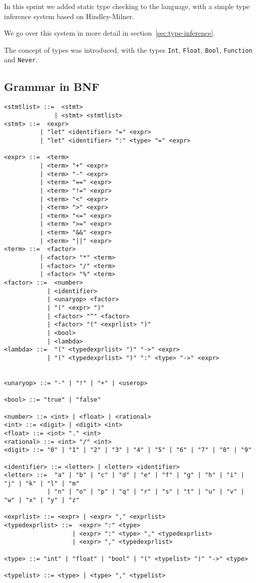 In this sprint we added static type checking to the language, with a simple type inference system based on 
Hindley-Milner.

We go over this system in more detail in section~\ref{sec:type-inference}.

The concept of types was introduced, with the types \texttt{Int}, \texttt{Float}, \texttt{Bool}, \texttt{Function} and
\texttt{Never}.

\subsection{Grammar in BNF}\label{subsec:grammar-in-bnf5}

\begin{verbatim}
<stmtlist> ::=  <stmt> 
              | <stmt> <stmtlist>
<stmt> ::=  <expr> 
          | "let" <identifier> "=" <expr>
          | "let" <identifier> ":" <type> "=" <expr>

<expr> ::=  <term> 
          | <term> "+" <expr> 
          | <term> "-" <expr>
          | <term> "==" <expr>
          | <term> "!=" <expr>
          | <term> "<" <expr>
          | <term> ">" <expr>
          | <term> "<=" <expr>
          | <term> ">=" <expr>
          | <term> "&&" <expr>
          | <term> "||" <expr>
<term> ::=  <factor> 
          | <factor> "*" <term> 
          | <factor> "/" <term> 
          | <factor> "%" <term> 
<factor> ::=  <number> 
            | <identifier> 
            | <unaryop> <factor>
            | "(" <expr> ")" 
            | <factor> "^" <factor>
            | <factor> "(" <exprlist> ")"
            | <bool>
            | <lambda>
<lambda> ::=  "(" <typedexprlist> ")" "->" <expr>
            | "(" <typedexprlist> ")" ":" <type> "->" <expr>


<unaryop> ::= "-" | "!" | "+" | <userop>

<bool> ::= "true" | "false"
            
<number> ::= <int> | <float> | <rational>
<int> ::= <digit> | <digit> <int>
<float> ::= <int> "." <int>
<rational> ::= <int> "/" <int>
<digit> ::= "0" | "1" | "2" | "3" | "4" | "5" | "6" | "7" | "8" | "9"

<identifier> ::= <letter> | <letter> <identifier>
<letter> ::=  "a" | "b" | "c" | "d" | "e" | "f" | "g" | "h" | "i" | "j" | "k" | "l" | "m" 
            | "n" | "o" | "p" | "q" | "r" | "s" | "t" | "u" | "v" | "w" | "x" | "y" | "z"
            
<exprlist> ::= <expr> | <expr> "," <exprlist>
<typedexprlist> ::=  <expr> ":" <type> 
                   | <expr> ":" <type> "," <typedexprlist>
                   | <expr> "," <typedexprlist>
    
<type> ::= "int" | "float" | "bool" | "(" <typelist> ")" "->" <type>

<typelist> ::= <type> | <type> "," <typelist>
\end{verbatim}

